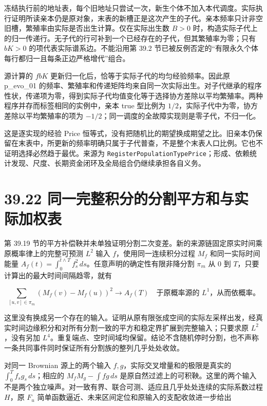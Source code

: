 \documentclass[
  11pt,
  oneside]{book}
\begin{document}
冻结执行前的地址表，每个旧地址只尝试一次，新生个体不加入本代调度。实际执行证明所读亲本仍是原对象，末表的新槽正是这次产生的子代。亲本频率只计非空旧槽，繁殖率由实际是否出生计算。仅在实际出生数 \(B>0\) 时，构造实际子代上的归一传递行。无子代的行可补到一个已经存在的子代，但其繁殖率为零；只有 \(bK>0\) 的项代表实际谱系边。不能沿用第 39.2 节已被反例否定的``有限永久个体每行都归一且每条正边严格增代''组合。

源计算的 \(f bK\) 更新归一化后，恰等于实际子代的均匀经验频率。因此原 p\_evo\_01 的频率、繁殖率和传递矩阵均来自同一次实际出生。对子代继承的程序性状，传递项为零，得到实际子代均值变化等于选择协方差除以平均繁殖率。两种程序并存而标签相同的实例中，亲本 true 型比例为 \(1/2\)，实际子代中为零，协方差除以平均繁殖率的项为 \(-1/2\)；同一调度的全故障实现则是零子代，不归一化。

这是逐实现的经验 Price 恒等式，没有把随机比的期望换成期望之比。旧亲本仍保留在末表中，所更新的频率明确只属于子代普查，不是整个末表人口比例。它也不证明选择必然趋于最优。来源为 \nolinkurl{RegisterPopulationTypePrice}；形成、依赖统计发现、尺度、长期资金闭环及全局组合仍继续承担各自义务。

\section{39.22 同一完整积分的分割平方和与实际加权表}\label{ux540cux4e00ux5b8cux6574ux79efux5206ux7684ux5206ux5272ux5e73ux65b9ux548cux4e0eux5b9eux9645ux52a0ux6743ux8868}

第 39.19 节的平方补偿鞅并未单独证明分割二次变差。新的来源链固定原实时间乘原概率律上的完整可预测 \(L^2\) 输入 \(f\)，使用同一连续积分过程 \(M_f\) 和同一实际时间能量 \(A_f(t)=\int_0^{t\wedge T}f_s^2\,ds\)。任意声明的确定性有限非降分割 \(\pi_m\) 从 \(0\) 到 \(T\)，只要计算出的最大时间间隔趋零，就有

\[\sum_{[u,v]\in\pi_m}(M_f(v)-M_f(u))^2\longrightarrow A_f(T)
\quad\text{于原概率源的 }L^1\text{，从而依概率。}\]

这里没有换成另一个存在的输入。证明从原有限张成空间的实际左采样出发，经真实时间边缘积分和对所有分割一致的平方和稳定界扩展到完整输入；只要求原 \(L^2\)，没有另加 \(L^4\)。重复端点、空时间域均保留。结论不含随机停时分割，也不声称一条共同事件同时保证所有分割族的整列几乎处处收敛。

对同一 Brownian 源上的两个输入 \(f,g\)，实际交叉增量和的极限是真实的 \(\int_0^T f_sg_s\,ds\)；相应的 \(M_fM_g-\int fg\,ds\) 是原自然过滤上的可积鞅。这里的两个输入不是两个独立噪声。对一致有界、联合可测、适应且几乎处处连续的实际系数过程 \(H\)，原 \(F_u\) 简单函数逼近、未来区间定位和原输入的支配收敛进一步给出
\end{document}
